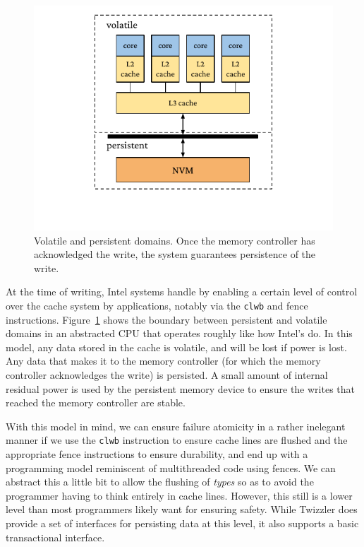 \begin{figure}
    \centering
    \includegraphics[width=\linewidth]{fig/vpdomains.pdf}
    \caption[Volatile and persistent domains]{Volatile and persistent domains. Once the memory controller has acknowledged the write, the system guarantees persistence of the write.}
    \label{fig:vpdomains}
\end{figure}



At the time of writing, Intel systems handle \NVM by enabling a certain level of control over the cache system by
applications, notably via the \texttt{clwb} and fence instructions. Figure~\ref{fig:vpdomains} shows the boundary
between persistent and volatile domains in an abstracted CPU that operates roughly like how Intel's do. In this model,
any data stored in the cache is volatile, and will be lost if power is lost. Any data that makes it to the memory
controller (for which the memory controller acknowledges the write) is persisted. A small amount of internal residual
power is used by the persistent memory device to ensure the writes that reached the memory controller are stable.

With this model in mind, we can ensure failure atomicity in a rather inelegant manner if we use the \texttt{clwb}
instruction to ensure cache lines are flushed and the appropriate fence instructions to ensure durability, and end up
with a programming model reminiscent of multithreaded code using fences. We can abstract this a little bit to allow the
flushing of \emph{types} so as to avoid the programmer having to think entirely in cache lines. However, this still is a
lower level than most programmers likely want for ensuring safety. While Twizzler does provide a set of interfaces for
persisting data at this level, it also supports a basic transactional interface.


